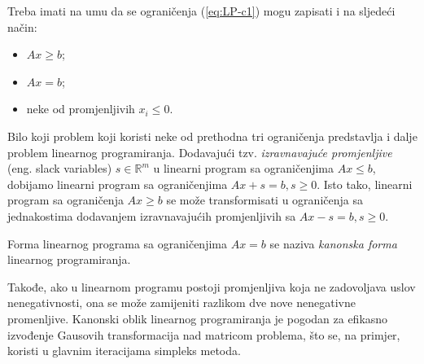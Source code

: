 \documentclass[b5paper, utf8, 11pt, colorlinks]{book}
\theoremstyle{definition}
\begin{document}
 Treba imati na umu da se ograničenja (\ref{eq:LP-c1}) mogu zapisati i na sljedeći način:
 \begin{itemize}
     \item $Ax \geq b$;
     \item $Ax = b$;
     \item neke od promjenljivih $x_i\leqslant 0$.
 \end{itemize}
 Bilo koji problem koji koristi neke od prethodna tri ograničenja predstavlja i dalje problem linearnog programiranja. Dodavajući tzv. \emph{izravnavajuće promjenljive} (eng. slack variables) $s \in \mathbb{R}^m$ u linearni program sa ograničenjima $Ax \leq b$, dobijamo linearni program sa ograničenjima $Ax + s = b, s \geq 0$. Isto tako, linearni program sa ograničenja $Ax \geq b$ se može transformisati u ograničenja sa jednakostima dodavanjem izravnavajućih promjenljivih sa $Ax - s = b, s\geq 0$.

  Forma linearnog programa sa ograničenjima $Ax = b$ se naziva \emph{kanonska forma} linearnog programiranja. 
 
  Takođe, ako u linearnom
 programu postoji promjenljiva koja ne zadovoljava uslov nenegativnosti, ona se može zamijeniti razlikom dve nove nenegativne promenljive. Kanonski oblik linearnog programiranja je pogodan za efikasno izvođenje Gausovih transformacija  nad matricom problema, što se, na primjer, koristi u glavnim iteracijama simpleks metoda.   %
\end{document}
